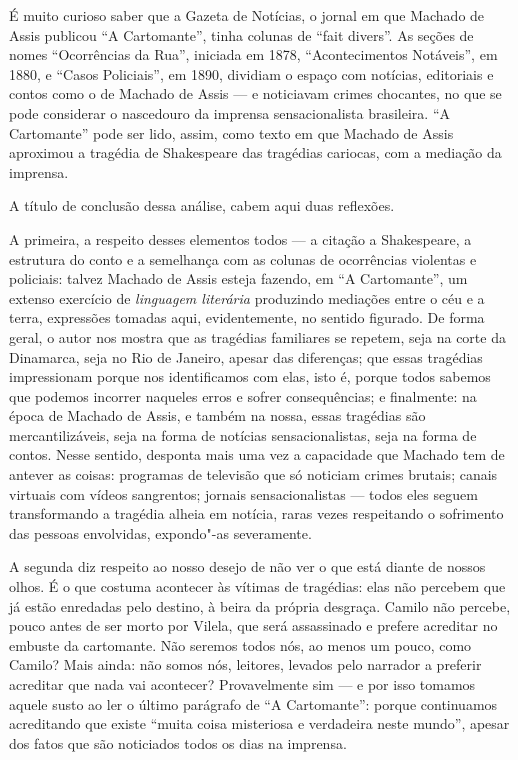 É muito curioso saber que a Gazeta de Notícias, o jornal em que Machado
de Assis publicou ``A Cartomante'', tinha colunas de ``fait divers''. As
seções de nomes ``Ocorrências da Rua'', iniciada em 1878,
``Acontecimentos Notáveis'', em 1880, e ``Casos Policiais'', em 1890,
dividiam o espaço com notícias, editoriais e contos como o de Machado de
Assis --- e noticiavam crimes chocantes, no que se pode considerar o
nascedouro da imprensa sensacionalista brasileira. ``A Cartomante'' pode
ser lido, assim, como texto em que Machado de Assis aproximou a tragédia
de Shakespeare das tragédias cariocas, com a mediação da imprensa.

A título de conclusão dessa análise, cabem aqui duas reflexões.

A primeira, a respeito desses elementos todos --- a citação a
Shakespeare, a estrutura do conto e a semelhança com as colunas de
ocorrências violentas e policiais: talvez Machado de Assis esteja
fazendo, em ``A Cartomante'', um extenso exercício de \emph{linguagem
literária} produzindo mediações entre o céu e a terra, expressões
tomadas aqui, evidentemente, no sentido figurado. De forma geral, o
autor nos mostra que as tragédias familiares se repetem, seja na corte
da Dinamarca, seja no Rio de Janeiro, apesar das diferenças; que essas
tragédias impressionam porque nos identificamos com elas, isto é, porque
todos sabemos que podemos incorrer naqueles erros e sofrer
consequências; e finalmente: na época de Machado de Assis, e também na
nossa, essas tragédias são mercantilizáveis, seja na forma de notícias
sensacionalistas, seja na forma de contos. Nesse sentido, desponta mais
uma vez a capacidade que Machado tem de antever as coisas: programas de
televisão que só noticiam crimes brutais; canais virtuais com vídeos
sangrentos; jornais sensacionalistas --- todos eles seguem transformando
a tragédia alheia em notícia, raras vezes respeitando o sofrimento das
pessoas envolvidas, expondo"-as severamente.

A segunda diz respeito ao nosso desejo de não ver o que está diante de
nossos olhos. É o que costuma acontecer às vítimas de tragédias: elas
não percebem que já estão enredadas pelo destino, à beira da própria
desgraça. Camilo não percebe, pouco antes de ser morto por Vilela, que
será assassinado e prefere acreditar no embuste da cartomante. Não
seremos todos nós, ao menos um pouco, como Camilo? Mais ainda: não somos
nós, leitores, levados pelo narrador a preferir acreditar que nada vai
acontecer? Provavelmente sim --- e por isso tomamos aquele susto ao ler o
último parágrafo de ``A Cartomante'': porque continuamos acreditando que
existe ``muita coisa misteriosa e verdadeira neste mundo'', apesar dos
fatos que são noticiados todos os dias na imprensa.

